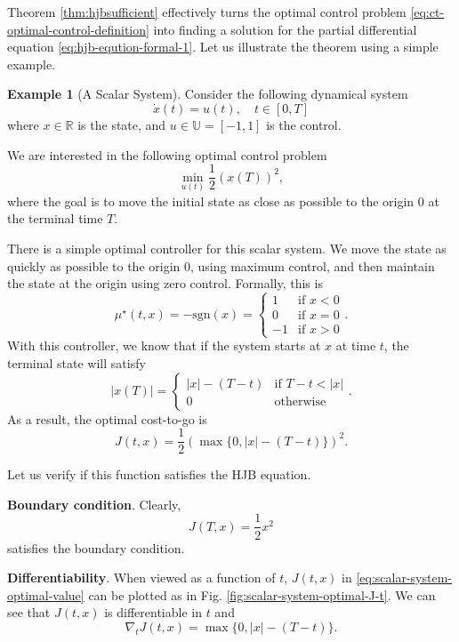 \documentclass[
]{book}
\theoremstyle{definition}
\theoremstyle{definition}
\newtheorem{example}{Example}[chapter]
\theoremstyle{definition}
\theoremstyle{definition}
\theoremstyle{remark}
\begin{document}
Theorem \ref{thm:hjbsufficient} effectively turns the optimal control problem \eqref{eq:ct-optimal-control-definition} into finding a solution for the partial differential equation \eqref{eq:hjb-eqution-formal-1}. Let us illustrate the theorem using a simple example.

\begin{example}[A Scalar System]
\protect\hypertarget{exm:hjbequationsimpleexample}{}\label{exm:hjbequationsimpleexample}Consider the following dynamical system
\[
\dot{x}(t) = u(t), \quad t \in [0,T]
\]
where \(x \in \mathbb{R}\) is the state, and \(u \in \mathbb{U} = [-1,1]\) is the control.

We are interested in the following optimal control problem
\[
\min_{u(t)} \frac{1}{2} \left( x(T) \right)^2,
\]
where the goal is to move the initial state as close as possible to the origin \(0\) at the terminal time \(T\).

There is a simple optimal controller for this scalar system. We move the state as quickly as possible to the origin \(0\), using maximum control, and then maintain the state at the origin using zero control. Formally, this is
\[
\mu^\star(t,x) = - \text{sgn}(x) = \begin{cases}
1 & \text{if } x < 0 \\
0 & \text{if } x = 0 \\
-1 & \text{if } x > 0
\end{cases}.
\]
With this controller, we know that if the system starts at \(x\) at time \(t\), the terminal state will satisfy
\[
\vert x(T) \vert = \begin{cases}
|x| - (T - t) & \text{if } T-t < |x|  \\
0 & \text{otherwise} 
\end{cases}.
\]
As a result, the optimal cost-to-go is
\begin{equation}
J(t,x) = \frac{1}{2} \left( \max\{0,  |x| - (T - t)\} \right)^2.
\label{eq:scalar-system-optimal-value}
\end{equation}

Let us verify if this function satisfies the HJB equation.

\textbf{Boundary condition}. Clearly,
\[
J(T,x) = \frac{1}{2}x^2
\]
satisfies the boundary condition.

\textbf{Differentiability}. When viewed as a function of \(t\), \(J(t,x)\) in \eqref{eq:scalar-system-optimal-value} can be plotted as in Fig. \ref{fig:scalar-system-optimal-J-t}. We can see that \(J(t,x)\) is differentiable in \(t\) and
\begin{equation}
\nabla_t J(t,x) = \max\{ 0, |x| - (T-t) \}.
\label{eq:scalar-system-partial-J-partial-t}
\end{equation}


\end{example}
\end{document}
